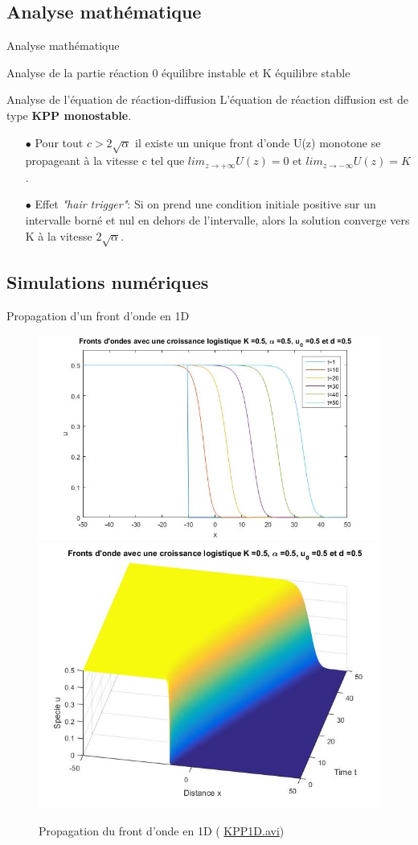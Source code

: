 \documentclass[10pt]{beamer}
\begin{document}
\subsection{Analyse mathématique}
\begin{frame}{Analyse mathématique}
	\begin{block}{Analyse de la partie réaction}
	 0 équilibre instable et K équilibre stable
		
	\end{block}
	
	\begin{block}{Analyse de l'équation de réaction-diffusion}
	 L'équation de réaction diffusion est de type \textbf{KPP monostable}.
		\begin{itemize}
		
			\item[$\bullet$] Pour tout $c> 2 \sqrt{\alpha}$ il existe un unique front d'onde U(z) monotone se propageant à la vitesse c tel que $lim_{z \to + \infty}U(z) =0$ et  $lim_{z \to - \infty} U(z)=K$.

			
			\item[$\bullet$] Effet \textit{"hair trigger"}: Si on prend une condition initiale positive sur un intervalle borné et nul en dehors de l'intervalle, alors la solution converge vers K à la vitesse $2\sqrt{\alpha}$.
			
		\end{itemize}
	\end{block}	
	
	

\end{frame}


\subsection{Simulations numériques}

\begin{frame}{Propagation d'un front d'onde en 1D}{}
	\begin{figure}[H]
		\centering
		\includegraphics[width=0.55\linewidth]{SimulationKPP/figures1/FrontOnde2}\hfill
		\includegraphics[width=0.40\linewidth]{SimulationKPP/figures1/FrontOnde1}\hfill
		\caption{Propagation du front d'onde en 1D ( \url{KPP1D.avi})}
	\end{figure}
\end{frame}
\end{document}
